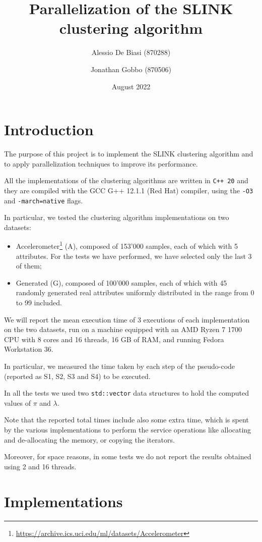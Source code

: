 \documentclass{article}
\title{Parallelization of the SLINK clustering algorithm\vspace{-1.25ex}}
\author{Alessio De Biasi (870288) \and Jonathan Gobbo (870506)}
\date{August 2022}
\begin{document}
\twocolumn
\maketitle

\section{Introduction}

The purpose of this project is to implement the SLINK clustering algorithm and to apply
parallelization techniques to improve its performance.

All the implementations of the clustering algorithms are written in \texttt{C++ 20} and they are
compiled with the GCC G++ 12.1.1 (Red Hat) compiler, using the \texttt{-O3} and
\texttt{-march=native} flags.

In particular, we tested the clustering algorithm implementations on two datasets:
\begin{itemize}
\item Accelerometer\footnote{\url{https://archive.ics.uci.edu/ml/datasets/Accelerometer}} (A),
composed
of 153'000 samples, each of which with 5 attributes. For the tests we have performed, we have
selected only the last 3 of them;
\item Generated (G), composed of 100'000 samples, each of which with 45 randomly generated real
attributes uniformly distributed in the range from 0 to 99 included.
\end{itemize}

We will report the mean execution time of 3 executions of each implementation on the two datasets,
run on a machine equipped with an AMD Ryzen 7 1700 CPU with 8 cores and 16 threads, 16 GB of RAM,
and running Fedora Workstation 36.

In particular, we measured the time taken by each step of the pseudo-code (reported as S1, S2, S3
and S4) to be executed.

In all the tests we used two \texttt{std::vector} data structures to hold the computed values of
$\pi$ and $\lambda$.

Note that the reported total times include also some extra time, which is spent by the various
implementations to perform the service operations like allocating and de-allocating the memory, or
copying the iterators.

Moreover, for space reasons, in some tests we do not report the results obtained using 2 and 16
threads.

\hypertarget{implementations}{
\section{Implementations}
\label{implementations}}
\end{document}
